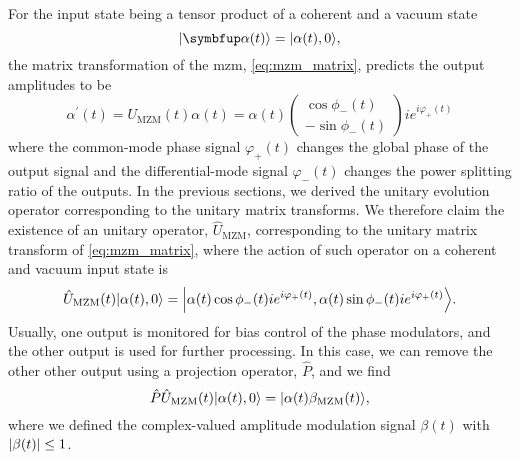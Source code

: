 For the input state being a tensor product of a coherent and a vacuum state
\begin{equation}
	\ket{\vb{\alpha}(t)}
	=
	\ket{\alpha(t),0}
	,
\end{equation}
the matrix transformation of the \gls{mzm}, \cref{eq:mzm_matrix}, predicts the output amplitudes to be
\begin{equation}
	\alpha^\prime(t)
	=
	U_\text{MZM}(t)
	\alpha(t)
	=
	\alpha(t)
	\begin{pmatrix}
		\cos\phi_-(t) \\
		-\sin\phi_-(t)
	\end{pmatrix}
	ie^{i\varphi_+(t)}
	\label{eq:mzm_amplitude_time}
\end{equation}
where the common-mode phase signal $\varphi_+(t)$ changes the global phase of the output signal and the differential-mode signal $\varphi_-(t)$ changes the power splitting ratio of the outputs.
In the previous sections, we derived the unitary evolution operator corresponding to the unitary matrix transforms.
We therefore claim the existence of an unitary operator, $\hat{U}_\text{MZM}$, corresponding to the unitary matrix transform of \cref{eq:mzm_matrix}, where the action of such operator on a coherent and vacuum input state is
\begin{equation}
	\hat{U}_\text{MZM}(t)
	\ket*{\alpha(t),0}
	=
	\ket*{\alpha(t)\cos\phi_-(t)ie^{i\varphi_+(t)},\alpha(t)\sin\phi_-(t)ie^{i\varphi_+(t)}}
	.
\end{equation}
Usually, one output is monitored for bias control of the phase modulators, and the other output is used for further processing.
In this case, we can remove the other other output using a projection operator, $\hat{P}$, and we find
\begin{equation}
	\hat{P}
	\hat{U}_\text{MZM}(t)
	\ket*{\alpha(t),0}
	=
	\ket*{\alpha(t)\beta_\text{MZM}(t)}
	\label{eq:mzm_state}
	,
\end{equation}
where we defined the complex-valued amplitude modulation signal $\beta(t)$ with $\lvert\beta(t)\rvert\leq 1$.

